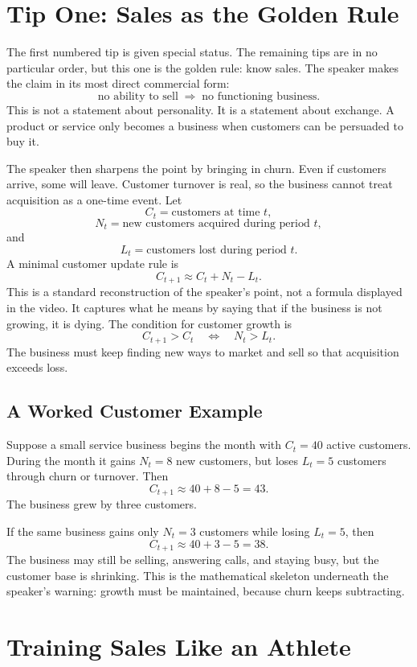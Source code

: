 \section{Tip One: Sales as the Golden Rule}

The first numbered tip is given special status. The remaining tips are in no particular order, but this one is the golden rule: know sales. The speaker makes the claim in its most direct commercial form:
\[
\text{no ability to sell}
\;\Longrightarrow\;
\text{no functioning business}.
\]
This is not a statement about personality. It is a statement about exchange. A product or service only becomes a business when customers can be persuaded to buy it.

The speaker then sharpens the point by bringing in churn. Even if customers arrive, some will leave. Customer turnover is real, so the business cannot treat acquisition as a one-time event. Let
\[
C_t = \text{customers at time }t,
\]
\[
N_t = \text{new customers acquired during period }t,
\]
and
\[
L_t = \text{customers lost during period }t.
\]
A minimal customer update rule is
\[
C_{t+1} \approx C_t + N_t - L_t.
\]
This is a standard reconstruction of the speaker's point, not a formula displayed in the video. It captures what he means by saying that if the business is not growing, it is dying. The condition for customer growth is
\[
C_{t+1} > C_t
\quad\Longleftrightarrow\quad
N_t > L_t.
\]
The business must keep finding new ways to market and sell so that acquisition exceeds loss.

\subsection{A Worked Customer Example}

Suppose a small service business begins the month with \(C_t=40\) active customers. During the month it gains \(N_t=8\) new customers, but loses \(L_t=5\) customers through churn or turnover. Then
\[
C_{t+1}
\approx
40 + 8 - 5
=
43.
\]
The business grew by three customers.

If the same business gains only \(N_t=3\) customers while losing \(L_t=5\), then
\[
C_{t+1}
\approx
40 + 3 - 5
=
38.
\]
The business may still be selling, answering calls, and staying busy, but the customer base is shrinking. This is the mathematical skeleton underneath the speaker's warning: growth must be maintained, because churn keeps subtracting.

\section{Training Sales Like an Athlete}

